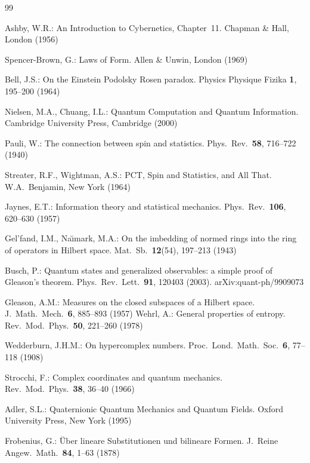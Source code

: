 \documentclass[11pt]{article}
\theoremstyle{remark}
\begin{document}
\begin{thebibliography}{99}

 Ashby, W.R.: An Introduction to Cybernetics, Chapter~11. Chapman \& Hall, London (1956)

 Spencer-Brown, G.: Laws of Form. Allen \& Unwin, London (1969)

 Bell, J.S.: On the Einstein Podolsky Rosen paradox. Physics Physique Fizika \textbf{1}, 195--200 (1964)

 Nielsen, M.A., Chuang, I.L.: Quantum Computation and Quantum Information. Cambridge University Press, Cambridge (2000)

 Pauli, W.: The connection between spin and statistics. Phys.\ Rev.\ \textbf{58}, 716--722 (1940)

 Streater, R.F., Wightman, A.S.: PCT, Spin and Statistics, and All That. W.A.\ Benjamin, New York (1964)

 Jaynes, E.T.: Information theory and statistical mechanics. Phys.\ Rev.\ \textbf{106}, 620--630 (1957)

 Gel'fand, I.M., Na\u{\i}mark, M.A.: On the imbedding of normed rings into the ring of operators in Hilbert space. Mat.\ Sb.\ \textbf{12}(54), 197--213 (1943)

 Busch, P.: Quantum states and generalized observables: a simple proof of Gleason's theorem. Phys.\ Rev.\ Lett.\ \textbf{91}, 120403 (2003). arXiv:quant-ph/9909073

 Gleason, A.M.: Measures on the closed subspaces of a Hilbert space. J.\ Math.\ Mech.\ \textbf{6}, 885--893 (1957)
 Wehrl, A.: General properties of entropy. Rev.\ Mod.\ Phys.\ \textbf{50}, 221--260 (1978)

 Wedderburn, J.H.M.: On hypercomplex numbers. Proc.\ Lond.\ Math.\ Soc.\ \textbf{6}, 77--118 (1908)

 Strocchi, F.: Complex coordinates and quantum mechanics. Rev.\ Mod.\ Phys.\ \textbf{38}, 36--40 (1966)

 Adler, S.L.: Quaternionic Quantum Mechanics and Quantum Fields. Oxford University Press, New York (1995)

 Frobenius, G.: \"{U}ber lineare Substitutionen und bilineare Formen. J.\ Reine Angew.\ Math.\ \textbf{84}, 1--63 (1878)


\end{thebibliography}
\end{document}
